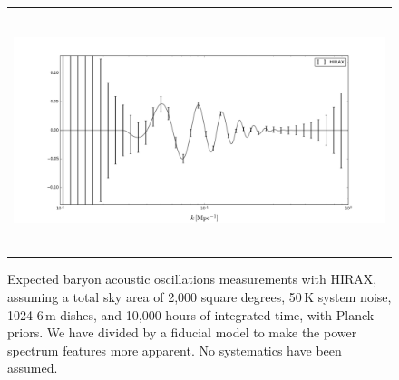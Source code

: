 \documentclass[]{spie}  %
\begin{document}
 \begin{figure} [t]
   \begin{center}
   \begin{tabular}{c} %
  \includegraphics[height=7cm]{fbao_constraints_hirax.png}
   \end{tabular}
   \end{center}
   \caption[dish] 
   { \label{fig:pspec} 
Expected baryon acoustic oscillations measurements with HIRAX, assuming a total sky area of 2,000 square degrees, 50\,K system noise, 1024 6\,m dishes, and 10,000 hours of integrated time, with Planck priors. We have divided by a fiducial model to make the power spectrum features more apparent. No systematics have been assumed. }
   \end{figure} 
   
\end{document}
